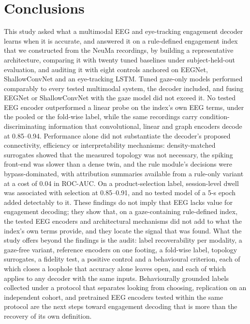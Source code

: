 \documentclass[pdflatex,sn-basic,Numbered,twocolumn,iicol]{sn-jnl}
\theoremstyle{thmstyleone}%
\theoremstyle{thmstyletwo}%
\theoremstyle{thmstylethree}%
\begin{document}
\section{Conclusions}\label{sec:conclusion}

This study asked what a multimodal EEG and eye-tracking engagement decoder learns when it is accurate, and answered it on a rule-defined engagement index that we constructed from the NeuMa recordings, by building a representative architecture, comparing it with twenty tuned baselines under subject-held-out evaluation, and auditing it with eight controls anchored on EEGNet, ShallowConvNet and an eye-tracking LSTM. Tuned gaze-only models performed comparably to every tested multimodal system, the decoder included, and fusing EEGNet or ShallowConvNet with the gaze model did not exceed it. No tested EEG encoder outperformed a linear probe on the index's own EEG terms, under the pooled or the fold-wise label, while the same recordings carry condition-discriminating information that convolutional, linear and graph encoders decode at 0.85--0.94. Performance alone did not substantiate the decoder's proposed connectivity, efficiency or interpretability mechanisms: density-matched surrogates showed that the measured topology was not necessary, the spiking front-end was slower than a dense twin, and the rule module's decisions were bypass-dominated, with attribution summaries available from a rule-only variant at a cost of 0.04 in ROC-AUC. On a product-selection label, session-level dwell was associated with selection at 0.85--0.91, and no tested model of a 5-s epoch added detectably to it. These findings do not imply that EEG lacks value for engagement decoding; they show that, on a gaze-containing rule-defined index, the tested EEG encoders and architectural mechanisms did not add to what the index's own terms provide, and they locate the signal that was found. What the study offers beyond the findings is the audit: label recoverability per modality, a gaze-free variant, reference encoders on one footing, a fold-wise label, topology surrogates, a fidelity test, a positive control and a behavioural criterion, each of which closes a loophole that accuracy alone leaves open, and each of which applies to any decoder with the same inputs. Behaviourally grounded labels collected under a protocol that separates looking from choosing, replication on an independent cohort, and pretrained EEG encoders tested within the same protocol are the next steps toward engagement decoding that is more than the recovery of its own definition.
\end{document}
